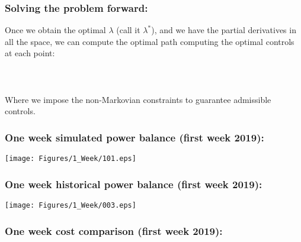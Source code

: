 
{
\begin{frame}[noframenumbering]
\frametitle{Solving the problem forward:}

Once we obtain the optimal $\lambda$ (call it $\lambda^*$), and we have the partial derivatives in all the space, we can compute the optimal path computing the optimal controls at each point:\\
\quad\\
{
\\
}\quad\\
Where we impose the non-Markovian constraints to guarantee admissible controls.

\end{frame}
}


{
\begin{frame}[noframenumbering]
\frametitle{One week simulated power balance (first week 2019):}
\centering
\texttt{[image: Figures/1\_Week/101.eps]}
\end{frame}
}


{
\begin{frame}[noframenumbering]
\frametitle{One week historical power balance (first week 2019):}
\centering
\texttt{[image: Figures/1\_Week/003.eps]}
\end{frame}
}


{
\begin{frame}[noframenumbering]
\frametitle{One week cost comparison (first week 2019):}
\begin{figure}[ht!]
\centering
{}\quad
{}
\end{figure}
\end{frame}
}

